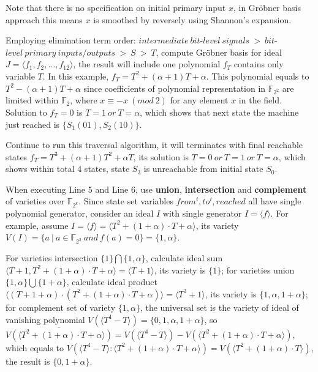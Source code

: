 \begin{Example}
Note that there is no specification on initial primary input $x$, in Gr\"obner basis approach this means $x$ is smoothed by
reversely using Shannon's expansion.

Employing elimination term order: $intermediate\ bit$-$level\ signals\ >\ bit$-$level\ primary\ inputs/outputs\ >\ S\ >\ T$, compute Gr\"obner basis for ideal
$J = \langle f_1, f_2, \dots, f_{12}\rangle $, the result will include one polynomial $f_T$ contains only variable $T$. In this example,
$f_T = T^2+(\alpha+1)T+\alpha$. This polynomial equals to $T^2-(\alpha+1)T+\alpha$ since coefficients of polynomial representation in $\mathbb{F}_{2^2}$ are
limited within $\mathbb{F}_{2}$, where $x \equiv -x\ (mod\ 2)$ for any element $x$ in the field. Solution to $f_T = 0$ is $T = 1\ or \ T = \alpha$, which shows that next
state the machine just reached is $\{S_1(01), S_2(10)\}$.

Continue to run this traversal algorithm, it will terminates with final reachable states $f_T = T^3+(\alpha+1)T^2+\alpha T$, its solution is $T=0\ or\ T=1\ or\ T=\alpha$,
which shows within total 4 states, state $S_3$ is unreachable from initial state $S_0$.

When executing Line 5 and Line 6, use \textbf{union}, \textbf{intersection} and \textbf{complement} of varieties over $\mathbb{F}_{2^k}$. Since
state set variables $from^i, to^i, reached$ all have single polynomial generator, consider an ideal $I$ with single generator $I = \langle f\rangle $.
For example, assume $I = \langle f\rangle  = \langle T^2 + (1+\alpha)\cdot T+\alpha\rangle $, its variety $V(I) = \{a\ |\ a \in \mathbb{F}_{2^2}\ and\ f(a) = 0\} = \{1, \alpha\}$.

For varieties intersection $\{1\}\bigcap\{1, \alpha\}$, calculate ideal sum $\langle T+1, T^2 + (1+\alpha)\cdot T+\alpha\rangle  = \langle T+1\rangle $,
its variety is $\{1\}$; for varieties union $\{1,\alpha\}\bigcup\{1+\alpha\}$, calculate
ideal product $\langle (T+1+\alpha)\cdot(T^2 + (1+\alpha)\cdot T+\alpha)\rangle  = \langle T^3 + 1\rangle $, its variety
is $\{1, \alpha, 1+\alpha\}$; for complement set of variety $\{1, \alpha\}$, the universal set is
the variety of ideal of vanishing polynomial $V(\langle T^4-T\rangle ) = \{0,1,\alpha,1+\alpha\}$,
so $\overline{V(\langle T^2 + (1+\alpha)\cdot T+\alpha\rangle )} = V(\langle T^4-T\rangle ) - V(\langle T^2 + (1+\alpha)\cdot T+\alpha\rangle )$,
which equals to $V(\langle T^4-T\rangle :\langle T^2 + (1+\alpha)\cdot T+\alpha\rangle ) = V(\langle T^2+(1+\alpha)\cdot T\rangle )$,
the result is $\{0,1+\alpha\}$.


\end{Example}
